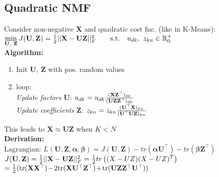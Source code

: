 \documentclass[a4paper,11pt]{article}
\newcommand{\R}{\mathbb{R}}
\begin{document}
\begin{multicols}{2}
\subsection{Quadratic NMF}
Consider non-negative \textbf{X} and quadratic cost fnc. (like in K-Means):\\
\hspace{1cm}$\min\limits_{\mathbf U,\ \mathbf Z} J(\mathbf U, \mathbf Z) = {1\over 2} || \mathbf X- \mathbf U \mathbf Z||_F^2\qquad \text{s.t.} \quad u_{dk},\ z_{kn} \in \R_0^+$\\
\textbf{Algorithm:}
\begin{enumerate}[leftmargin=0.5cm]
  \itemsep0em 
  \item Init $\mathbf U,\ \mathbf Z$ with pos. random values
  \item loop:\\
  \emph{Update factors} \textbf{U}: $u_{dk} = u_{dk}{ (\mathbf X \mathbf Z^\top)_{dk} \over (\mathbf U \mathbf Z \mathbf Z^\top)_{dk}}$\\
  \emph{Update coefficients} \textbf{Z}: $z_{kn} = z_{kn} {(\mathbf U^\top \mathbf X)_{kn} \over (\mathbf U^\top \mathbf U \mathbf Z)_{kn}}$
\end{enumerate}
This leads to $\mathbf X \approx \mathbf{UZ}$ when $K<N$\\
\vspace{0.1cm}
\textbf{Derivation:}\\
Lagrangian: $L(\mathbf{U}, \mathbf{Z}, \boldsymbol{\alpha}, \boldsymbol{\beta})= J(\mathbf{U}, \mathbf{Z})-tr(\boldsymbol \alpha \mathbf{U}^\top) - tr(\boldsymbol \beta \mathbf{Z}^\top)$\\
$J(\mathbf U, \mathbf Z) = {1\over 2} || \mathbf X- \mathbf U \mathbf Z||_F^2 = \frac{1}{2} tr\left( (X-UZ)(X-UZ)^T \right)$\\
\hspace{3.3cm}$= \frac{1}{2} (\text{tr}(\mathbf{X} \mathbf{X}^\top) \hspace{-0.05cm} - \hspace{-0.05cm} 2\text{tr}(\mathbf{X} \mathbf{U}^\top \mathbf{Z}^\top) \hspace{-0.05cm} + \hspace{-0.05cm} \text{tr}(\mathbf{U} \mathbf{Z} \mathbf{Z}^\top \mathbf{U}^\top))$\\

\end{multicols}
\end{document}
